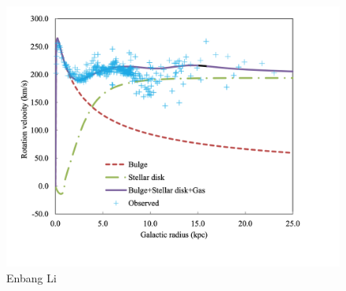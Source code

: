 \documentclass[reprint,%
 amsmath,amssymb,
 aps,
]{revtex4-1}
\begin{document}
 
\begin{figure}
    \centering
    \includegraphics{MW_Enbang_Li}
    \caption{Enbang Li \cite{Li2016ModellingMD}}
    \label{fig:my_label}
\end{figure}

    
     

 
\end{document}
